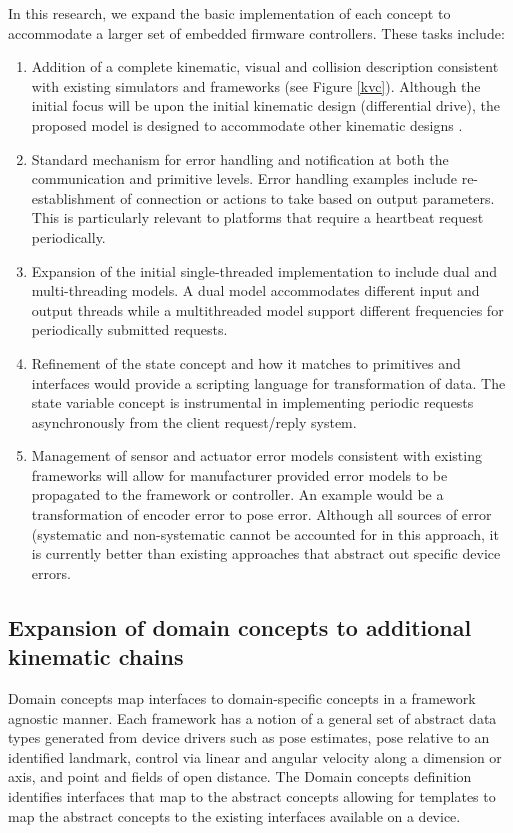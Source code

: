 In this research, we expand the basic implementation of each concept to accommodate a larger set of embedded firmware controllers.  These tasks include: 
\begin{enumerate}
\item Addition of a complete kinematic, visual and collision description consistent with existing simulators and frameworks (see Figure \ref{kvc}).  Although the initial focus will be upon the initial kinematic design (differential drive), the proposed model is designed to accommodate other kinematic designs .
\item Standard mechanism for error handling and notification at both the communication and primitive levels.  Error handling examples include re-establishment of connection or actions to take based on output parameters.  This is particularly relevant to platforms that require a heartbeat request periodically.
\item Expansion of the initial single-threaded implementation to include dual and multi-threading models.  A dual model accommodates different input and output threads while a multithreaded model support different frequencies for periodically submitted requests. 
\item Refinement of the state concept and how it matches to primitives and interfaces would provide a scripting language for transformation of data.  The state variable concept is instrumental in implementing periodic requests asynchronously from the client request/reply system.
\item Management of sensor and actuator error models consistent with existing frameworks will allow for manufacturer provided error models to be propagated to the framework or controller.  An example would be a transformation of encoder error to pose error.  Although all sources of error (systematic and non-systematic cannot be accounted for in this approach, it is currently better than existing approaches that abstract out specific device errors.
\end{enumerate}


\subsection{Expansion of domain concepts to additional kinematic chains}
Domain concepts map interfaces to domain-specific concepts in a framework agnostic manner.  Each framework has a notion of a general set of abstract data types generated from device drivers such as pose estimates, pose relative to an identified landmark, control via linear and angular velocity along a dimension or axis, and point and fields of open distance.  The {\sc Domain concepts} definition identifies interfaces that map to the abstract concepts allowing for templates to map the abstract concepts to the existing interfaces available on a device.

